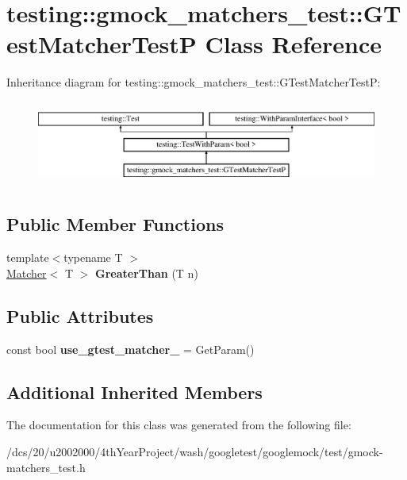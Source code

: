 \hypertarget{classtesting_1_1gmock__matchers__test_1_1GTestMatcherTestP}{}\section{testing\+:\+:gmock\+\_\+matchers\+\_\+test\+:\+:G\+Test\+Matcher\+TestP Class Reference}
\label{classtesting_1_1gmock__matchers__test_1_1GTestMatcherTestP}
Inheritance diagram for testing\+:\+:gmock\+\_\+matchers\+\_\+test\+:\+:G\+Test\+Matcher\+TestP\+:\begin{figure}[H]
\begin{center}
\leavevmode
\includegraphics[height=2.818792cm]{classtesting_1_1gmock__matchers__test_1_1GTestMatcherTestP}
\end{center}
\end{figure}
\subsection*{Public Member Functions}
\begin{DoxyCompactItemize}
\item 
\mbox{\label{classtesting_1_1gmock__matchers__test_1_1GTestMatcherTestP_afb2929f2e208b847f77e4575767f8403}} 
{\footnotesize template$<$typename T $>$ }\\\mbox{\hyperlink{classtesting_1_1Matcher}{Matcher}}$<$ T $>$ {\bfseries Greater\+Than} (T n)
\end{DoxyCompactItemize}
\subsection*{Public Attributes}
\begin{DoxyCompactItemize}
\item 
\mbox{\label{classtesting_1_1gmock__matchers__test_1_1GTestMatcherTestP_a18eb70db33421abf2da52e899a25caa2}} 
const bool {\bfseries use\+\_\+gtest\+\_\+matcher\+\_\+} = Get\+Param()
\end{DoxyCompactItemize}
\subsection*{Additional Inherited Members}


The documentation for this class was generated from the following file\+:\begin{DoxyCompactItemize}
\item 
/dcs/20/u2002000/4th\+Year\+Project/wash/googletest/googlemock/test/gmock-\/matchers\+\_\+test.\+h\end{DoxyCompactItemize}
